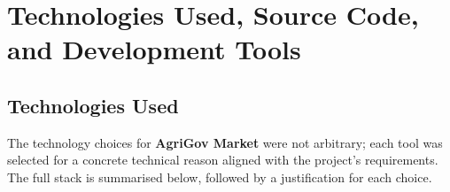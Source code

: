 
\section{Technologies Used, Source Code, and Development Tools}

\subsection{Technologies Used}

The technology choices for \textbf{AgriGov Market} were not arbitrary; each tool was selected for a concrete technical reason aligned with the project's requirements. The full stack is summarised below, followed by a justification for each choice.

